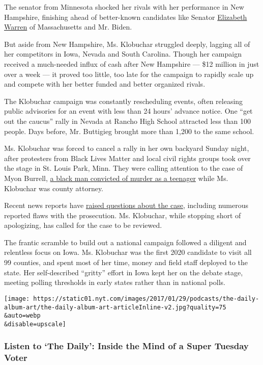 The senator from Minnesota shocked her rivals with her performance in
New Hampshire, finishing ahead of better-known candidates like Senator
\href{https://www.nytimes.com/interactive/2020/us/elections/elizabeth-warren.html}{Elizabeth
Warren} of Massachusetts and Mr. Biden.

But aside from New Hampshire, Ms. Klobuchar struggled deeply, lagging
all of her competitors in Iowa, Nevada and South Carolina. Though her
campaign received a much-needed influx of cash after New Hampshire ---
\$12 million in just over a week --- it proved too little, too late for
the campaign to rapidly scale up and compete with her better funded and
better organized rivals.

The Klobuchar campaign was constantly rescheduling events, often
releasing public advisories for an event with less than 24 hours'
advance notice. One ``get out the caucus'' rally in Nevada at Rancho
High School attracted less than 100 people. Days before, Mr. Buttigieg
brought more than 1,200 to the same school.

Ms. Klobuchar was forced to cancel a rally in her own backyard Sunday
night, after protesters from Black Lives Matter and local civil rights
groups took over the stage in St. Louis Park, Minn. They were calling
attention to the case of Myon Burrell,
\href{https://www.nytimes.com/2020/01/31/us/politics/amy-klobuchar-myon-burrell.html}{a
black man convicted of murder as a teenager} while Ms. Klobuchar was
county attorney.

Recent news reports have
\href{https://www.nytimes.com/2020/02/26/us/klobuchar-prosecutor-myon-burrell.html}{raised
questions about the case}, including numerous reported flaws with the
prosecution. Ms. Klobuchar, while stopping short of apologizing, has
called for the case to be reviewed.

The frantic scramble to build out a national campaign followed a
diligent and relentless focus on Iowa. Ms. Klobuchar was the first 2020
candidate to visit all 99 counties, and spent most of her time, money
and field staff deployed to the state. Her self-described ``gritty''
effort in Iowa kept her on the debate stage, meeting polling thresholds
in early states rather than in national polls.

\texttt{[image: https://static01.nyt.com/images/2017/01/29/podcasts/the-daily-album-art/the-daily-album-art-articleInline-v2.jpg?quality=75\\\&auto=webp\\\&disable=upscale]}

\hypertarget{listen-to-the-daily-inside-the-mind-of-a-super-tuesday-voter}{%
\subsubsection{Listen to `The Daily': Inside the Mind of a Super Tuesday
Voter}\label{listen-to-the-daily-inside-the-mind-of-a-super-tuesday-voter}}

